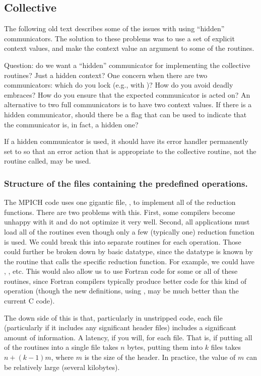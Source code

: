 \documentclass{article}
\begin{document}
\subsection{Collective}  

The following old text describes some of the issues with using
``hidden'' communicators.  The solution to these problems was to use a
set of explicit context values, and make the context value an argument
to some of the routines.

Question: do we want a ``hidden'' communicator for implementing the
collective routines?  Just a hidden context?  One concern when there
are two communicators: which do you lock (e.g., with
)?  How do you avoid deadly embraces?  How do
you 
ensure that the expected communicator is acted on?  An alternative to two full
communicators is to have two context values.  If there is a hidden
communicator, should there be a flag that can be used to indicate that the
communicator is, in fact, a hidden one?

If a hidden communicator is used, it should have its error handler permanently
set to  so that an error action that is
appropriate to 
the collective routine, not the routine called, may be used.

\subsubsection{Structure of the files containing the predefined operations.}

The MPICH code uses one gigantic file, , to implement
all of the reduction functions.  There are two problems with this.
First, some compilers become unhappy with it and do not optimize it
very well.  Second, all applications must load all of the routines
even though only a few (typically one) reduction function is used.  We
could break this into separate routines for each operation.  Those
could further be broken down by basic datatype, since the datatype is
known by the routine that calls the specific reduction function.  
For example, we could have ,
, etc.  This would also allow us to use Fortran
code for some or all of these routines, since Fortran compilers
typically produce better code for this kind of operation (though the
new definitions, using , may be much better than the
current C code).

The down side of this is that, particularly in unstripped code, each
file (particularly if it includes any significant header files)
includes a significant amount of information.  A latency, if you will,
for each file.  That is, if putting all of the routines into a single
file takes $n$ bytes, putting them into $k$ files takes $n + (k-1)m$,
where $m$ is the size of the header.  In practice, the value of $m$ can be
relatively large (several kilobytes).
\end{document}
